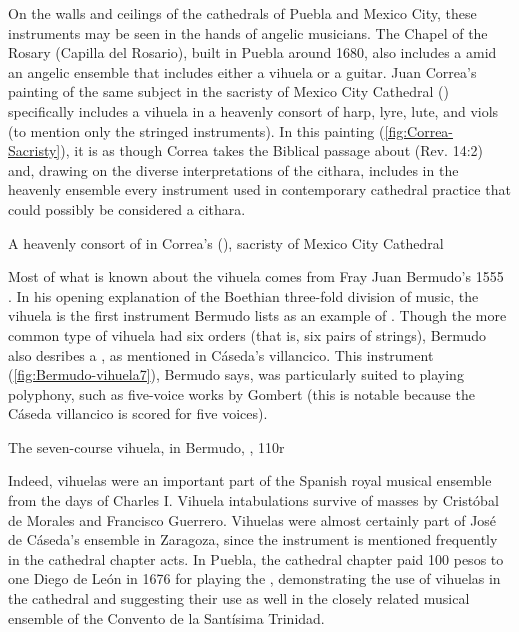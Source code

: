 On the walls and ceilings of the cathedrals of Puebla and Mexico City, these
instruments may be seen in the hands of angelic musicians.
The Chapel of the Rosary (Capilla del Rosario), built in Puebla around 1680,
also includes a  amid an angelic ensemble
that includes either a vihuela or a guitar.
Juan Correa's painting of the same subject in the sacristy of Mexico City
Cathedral () specifically includes a vihuela in a heavenly consort of
harp, lyre, lute, and viols (to mention only the stringed instruments).
In this painting (\cref{fig:Correa-Sacristy}), it is as though Correa takes the
Biblical passage about 
(Rev. 14:2) and, drawing on the diverse interpretations of the cithara, includes
in the heavenly ensemble every instrument used in contemporary cathedral
practice that could possibly be considered a cithara.

{A heavenly consort of  in Correa's  (), sacristy of Mexico City Cathedral}

Most of what is known about the vihuela comes from Fray Juan Bermudo's 1555
.
    \Autocite{Bermudo:Declaracion}
In his opening explanation of the Boethian three-fold division of music, the
vihuela is the first instrument Bermudo lists as an example of
 .
Though the more common type of vihuela had six orders (that is, six pairs of
strings), Bermudo also desribes a , as
mentioned in Cáseda's villancico.%
    \Autocite[90v--110r]{Bermudo:Declaracion}
This instrument (\cref{fig:Bermudo-vihuela7}), Bermudo says, was particularly
suited to playing polyphony, such as five-voice works by Gombert (this is
notable because the Cáseda villancico is scored for five voices).

{The seven-course vihuela, in Bermudo, , 110r}

Indeed, vihuelas were an important part of the Spanish royal musical ensemble
from the days of Charles I.
Vihuela intabulations survive of masses by Cristóbal de Morales and Francisco
Guerrero.%
    \Autocite{Grove:Vihuela}
Vihuelas were almost certainly part of José de Cáseda's ensemble in Zaragoza,
since the instrument is mentioned frequently in the cathedral chapter acts.%
    \Autocite{Calahorra:Zaragoza2} %
In Puebla, the cathedral chapter paid 100 pesos to one Diego de León in 1676
for playing the , demonstrating the use of vihuelas in
the cathedral and suggesting their use as well in the closely related musical
ensemble of the Convento de la Santísima Trinidad.%
    \Autocite[44]{PerezRuiz:Aportes} %

